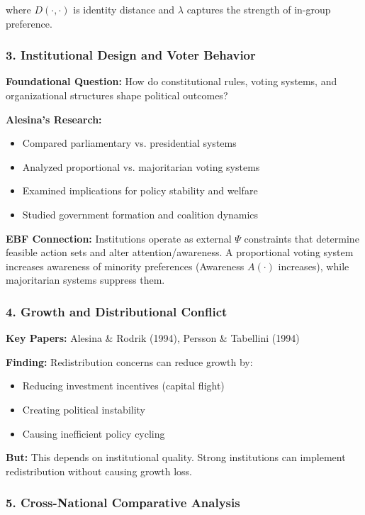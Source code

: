 where $D(\cdot,\cdot)$ is identity distance and $\lambda$ captures the strength of in-group preference.

\subsubsection{3. Institutional Design and Voter Behavior}

\textbf{Foundational Question:} How do constitutional rules, voting systems, and organizational structures shape political outcomes?

\textbf{Alesina's Research:}
\begin{itemize}
\item Compared parliamentary vs. presidential systems
\item Analyzed proportional vs. majoritarian voting systems
\item Examined implications for policy stability and welfare
\item Studied government formation and coalition dynamics
\end{itemize}

\textbf{EBF Connection:} Institutions operate as external $\Psi$ constraints that determine feasible action sets and alter attention/awareness. A proportional voting system increases awareness of minority preferences (Awareness $A(\cdot)$ increases), while majoritarian systems suppress them.

\subsubsection{4. Growth and Distributional Conflict}

\textbf{Key Papers:} Alesina \& Rodrik (1994), Persson \& Tabellini (1994)

\textbf{Finding:} Redistribution concerns can reduce growth by:
\begin{itemize}
\item Reducing investment incentives (capital flight)
\item Creating political instability
\item Causing inefficient policy cycling
\end{itemize}

\textbf{But:} This depends on institutional quality. Strong institutions can implement redistribution without causing growth loss.

\subsubsection{5. Cross-National Comparative Analysis}


